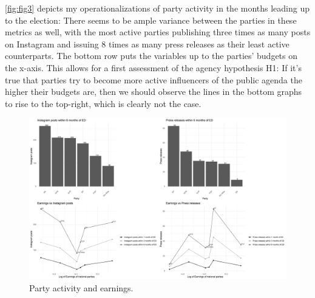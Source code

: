 \documentclass[11pt,a4paper]{article}
\begin{document}
\autoref{fig:fig3} depicts my operationalizations of party activity in the months leading up to the election: There seems to be ample variance between the parties in these metrics as well, with the most active parties publishing three times as many posts on Instagram and issuing 8 times as many press releases as their least active counterparts. The bottom row puts the variables up to the parties’ budgets on the x-axis. This allows for a first assessment of the agency hypothesis H1: If it’s true that parties try to become more active influencers of the public agenda the higher their budgets are, then we should observe the lines in the bottom graphs to rise to the top-right, which is clearly not the case.
\begin{figure}
    \centering
    \includegraphics[width=1\linewidth]{output/plots/plot_figure_3.png}
    \caption{Party activity and earnings.}
    \label{fig:fig3}
\end{figure}
\end{document}
